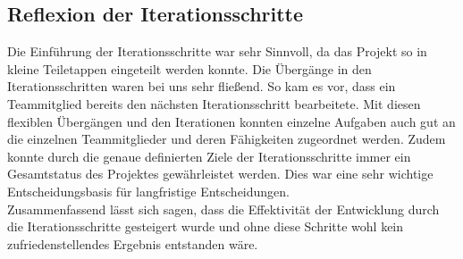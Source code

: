 \subsection{Reflexion der Iterationsschritte}
Die Einführung der Iterationsschritte war sehr Sinnvoll, da das Projekt so in kleine Teiletappen eingeteilt werden konnte. Die Übergänge in den Iterationsschritten waren bei uns sehr fließend. So kam es vor, dass ein Teammitglied bereits den nächsten Iterationsschritt bearbeitete. Mit diesen flexiblen Übergängen und den Iterationen konnten einzelne Aufgaben auch gut an die einzelnen Teammitglieder und deren Fähigkeiten zugeordnet werden. Zudem konnte durch die genaue definierten Ziele der Iterationsschritte immer ein Gesamtstatus des Projektes gewährleistet werden. Dies war eine sehr wichtige Entscheidungsbasis für langfristige Entscheidungen.\\
Zusammenfassend lässt sich sagen, dass die Effektivität der Entwicklung durch die Iterationsschritte gesteigert wurde und ohne diese Schritte wohl kein zufriedenstellendes Ergebnis entstanden wäre.

